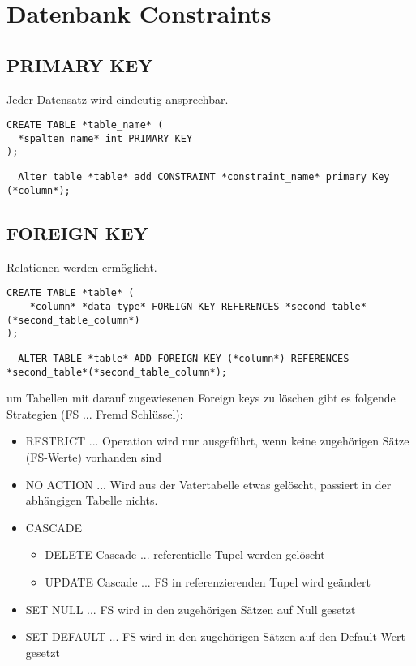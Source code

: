 \section{Datenbank Constraints}

\subsection{PRIMARY KEY}

Jeder Datensatz wird eindeutig ansprechbar.

\begin{lstlisting}
CREATE TABLE *table_name* (
  *spalten_name* int PRIMARY KEY
);
\end{lstlisting}


\begin{lstlisting}
  Alter table *table* add CONSTRAINT *constraint_name* primary Key (*column*);
\end{lstlisting}


\subsection{FOREIGN KEY}

Relationen werden ermöglicht.

\begin{lstlisting}
CREATE TABLE *table* (
    *column* *data_type* FOREIGN KEY REFERENCES *second_table*(*second_table_column*)
);
\end{lstlisting}


\begin{lstlisting}
  ALTER TABLE *table* ADD FOREIGN KEY (*column*) REFERENCES *second_table*(*second_table_column*);
\end{lstlisting}

\hfill\break
um Tabellen mit darauf zugewiesenen Foreign keys zu löschen gibt es folgende Strategien (FS ... Fremd Schlüssel):

\begin{itemize}
  \item RESTRICT ... Operation wird nur ausgeführt, wenn keine zugehörigen Sätze (FS-Werte) vorhanden sind
  \item NO ACTION ... Wird aus der Vatertabelle etwas gelöscht, passiert in der abhängigen Tabelle nichts.
  \item CASCADE
  \begin{itemize}
    \item DELETE Cascade ... referentielle Tupel werden gelöscht
    \item UPDATE Cascade ... FS in referenzierenden Tupel wird geändert
  \end{itemize}
  \item SET NULL ... FS wird in den zugehörigen Sätzen auf Null gesetzt
  \item SET DEFAULT ... FS wird in den zugehörigen Sätzen auf den Default-Wert gesetzt
\end{itemize}


